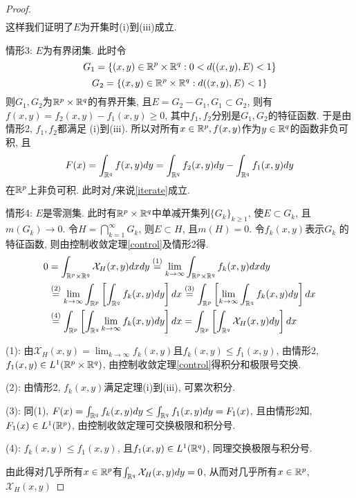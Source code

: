 \documentclass[12pt, a4paper, oneside, UTF8]{ctexbook}  %
\begin{document}
\begin{proof}
\begin{align*}
    \end{align*}
    这样我们证明了$E$为开集时(i)到(iii)成立. 
    \vspace{1cm}
    \par 情形3: $E$为有界闭集. 此时令
    $$ G_1 = \{(x, y)\in\mathbb{R}^p\times\mathbb{R}^q: 0<d((x, y), E)<1\} $$
    $$ G_2 = \{(x, y)\in\mathbb{R}^p\times\mathbb{R}^q: d((x, y), E)<1\} $$
    则$G_1, G_2$为$\mathbb{R}^p\times\mathbb{R}^q$的有界开集, 且$E = G_2 - G_1, G_1\subset G_2$, 则有
    $f(x, y) = f_2(x, y) - f_1(x, y)\geq 0$, 其中$f_1, f_2$分别是$G_1, G_2$的特征函数. 于是由情形2, $f_1, f_2$都满足
    (i)到(iii). 所以对所有$x\in\mathbb{R}^p, f(x, y)$作为$y\in\mathbb{R}^q$的函数非负可积, 且
    $$ F(x) = \int_{\mathbb{R}^q}f(x, y)dy = \int_{\mathbb{R}^q}f_2(x, y)dy - \int_{\mathbb{R}^q}f_1(x, y)dy $$
    在$\mathbb{R}^p$上非负可积. 此时对$f$来说\ref{iterate}成立. 
    \vspace{1cm}
    \par 情形4: $E$是零测集. 此时有$\mathbb{R}^p\times\mathbb{R}^q$中单减开集列$\{ G_k \}_{k\geq 1}$, 使$E\subset G_k$, 且
    $m(G_k)\rightarrow 0$. 令$H = \bigcap_{k=1}^\infty G_k$, 则$E\subset H$, 且$m(H) = 0$. 令$f_k(x, y)$表示$G_k$
    的特征函数, 则由控制收敛定理\ref{control}及情形2得. 
    \begin{align*}
        0& = \int_{\mathbb{R}^p\times\mathbb{R}^q}\mathcal{X}_H(x, y)dxdy \stackrel{(1)}{=} \lim_{k\to\infty}\int_{\mathbb{R}^p\times\mathbb{R}^q}f_k(x, y)dxdy  \\
         & \stackrel{(2)}{=} \lim_{k\to\infty}\int_{\mathbb{R}^p}\left[\int_{\mathbb{R}^q}f_k(x, y)dy\right]dx \stackrel{(3)}{=} 
         \int_{\mathbb{R}^p}\left[ \lim_{k\to\infty}\int_{\mathbb{R}^q} f_k(x, y)dy \right]dx \\
         & \stackrel{(4)}{=} \int_{\mathbb{R}^p}\left[ \int_{\mathbb{R}^q} \lim_{k\to\infty}f_k(x, y)dy \right]dx = 
         \int_{\mathbb{R}^p}\left[ \int_{\mathbb{R}^q} \mathcal{X}_H(x, y)dy \right]dx
    \end{align*}
    \par (1): 由$\mathcal{X}_H(x, y) = \lim_{k\to\infty}f_k(x, y)$且$f_k(x, y)\leq f_1(x, y)$, 由情形2, $f_1(x, y)\in L^1(\mathbb{R}^p\times\mathbb{R}^q)$,
    由控制收敛定理\ref{control}得积分和极限号交换. 
    \par (2): 由情形2, $f_k(x, y)$满足定理(i)到(iii), 可累次积分.
    \par (3): 同(1), $F(x) = \int_{\mathbb{R}^q}f_k(x, y)dy\leq \int_{\mathbb{R}^q}f_1(x, y)dy = F_1(x)$, 
    且由情形2知, $F_1(x)\in L^1(\mathbb{R}^p)$, 由控制收敛定理可交换极限和积分号. 
    \par (4): $f_k(x, y)\leq f_1(x, y)$, 且$f_1(x, y)\in L^1(\mathbb{R}^q)$, 同理交换极限与积分号. 
    \par 由此得对几乎所有$x\in\mathbb{R}^p$有$\int_{\mathbb{R}^q} \mathcal{X}_H(x, y)dy = 0$, 从而对几乎所有$x\in\mathbb{R}^p$, $\mathcal{X}_H(x, y)$

\end{proof}
\end{document}
